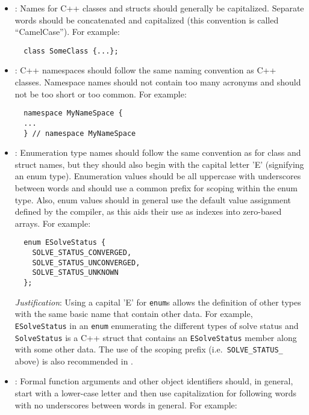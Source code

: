 \begin{itemize}

{}\item\NCClassNames: Names for C++ classes and structs should
generally be capitalized.  Separate words should be concatenated and
capitalized (this convention is called ``CamelCase'').  For example:

{\small\begin{verbatim}
  class SomeClass {...};
\end{verbatim}}


{}\item\NCNamespaceNames: C++ namespaces should follow the same naming
convention as C++ classes.  Namespace names should not contain too many
acronyms and should not be too short or too common.  For example:

{\small\begin{verbatim}
  namespace MyNameSpace {
  ...
  } // namespace MyNameSpace 
\end{verbatim}}


{}\item\NCEnumNames: Enumeration type names should follow the same
convention as for class and struct names, but they should also begin
with the capital letter 'E' (signifying an enum type).  Enumeration
values should be all uppercase with underscores between words and
should use a common prefix for scoping within the enum type.  Also,
enum values should in general use the default value assignment defined
by the compiler, as this aids their use as indexes into zero-based
arrays.  For example:

{\small\begin{verbatim}
  enum ESolveStatus {
    SOLVE_STATUS_CONVERGED,
    SOLVE_STATUS_UNCONVERGED,
    SOLVE_STATUS_UNKNOWN
  };
\end{verbatim}}


{}\textit{Justification}: Using a capital 'E' for {}\texttt{enum}s allows the
definition of other types with the same basic name that contain other data.
For example, {}\texttt{ESolveStatus} in an {}\texttt{enum} enumerating the
different types of solve status and {}\texttt{SolveStatus} is a C++ struct
that contains an {}\texttt{ESolveStatus} member along with some other data.
The use of the scoping prefix (i.e.\ {}\texttt{SOLVE\-\_STATUS\_} above) is
also recommended in {}\cite[Section 11.4]{CodeComplete2nd04}.


{}\item\NCObjectNames: Formal function arguments and other object identifiers
should, in general, start with a lower-case letter and then use capitalization
for following words with no underscores between words in general.  For
example:


\end{itemize}
